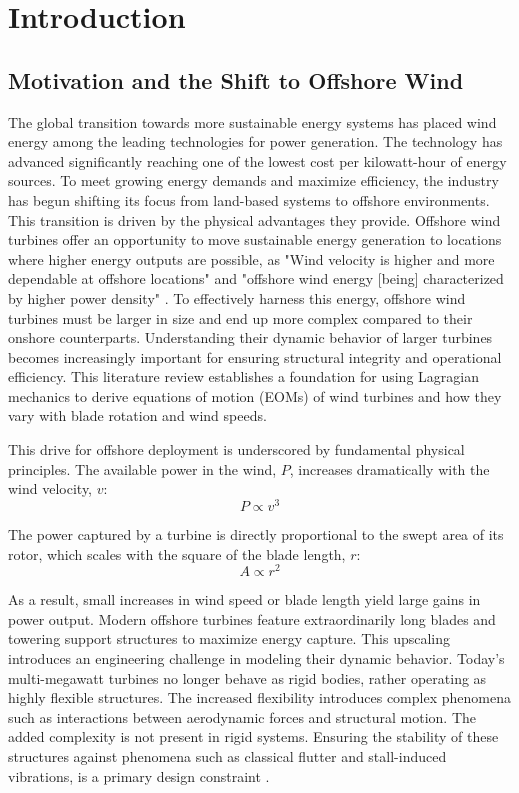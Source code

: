 \documentclass[final,onecolumn]{IEEEtran}
\begin{document}
\newpage
\tableofcontents
\newpage

\section{Introduction}

\subsection{Motivation and the Shift to Offshore Wind}
The global transition towards more sustainable energy systems has placed wind energy among the leading technologies for power generation. The technology has advanced significantly reaching one of the lowest cost per kilowatt-hour of energy sources. To meet growing energy demands and maximize efficiency, the industry has begun shifting its focus from land-based systems to offshore environments. This transition is driven by the physical advantages they provide. Offshore wind turbines offer an opportunity to move sustainable energy generation to locations where higher energy outputs are possible, as "Wind velocity is higher and more dependable at offshore locations" and "offshore wind energy [being] characterized by higher power density" \cite{Desalegn2023onshore}. To effectively harness this energy, offshore wind turbines must be larger in size and end up more complex compared to their onshore counterparts. Understanding their dynamic behavior of larger turbines becomes increasingly important for ensuring structural integrity and operational efficiency. This literature review establishes a foundation for using Lagragian mechanics to derive equations of motion (EOMs) of wind turbines and how they vary with blade rotation and wind speeds.

This drive for offshore deployment is underscored by fundamental physical principles. The available power in the wind, $P$, increases dramatically with the wind velocity, $v$:
\begin{equation}
    \label{eq:power_wind}
    P \propto v^{3}
\end{equation}

The power captured by a turbine is directly proportional to the swept area of its rotor, which scales with the square of the blade length, $r$:
\begin{equation}
    \label{eq:power_area}
    A \propto r^{2}
\end{equation}

As a result, small increases in wind speed or blade length yield large gains in power output. Modern offshore turbines feature extraordinarily long blades and towering support structures to maximize energy capture. This upscaling introduces an engineering challenge in modeling their dynamic behavior. Today's multi-megawatt turbines no longer behave as rigid bodies, rather operating as highly flexible structures. The increased flexibility introduces complex phenomena such as interactions between aerodynamic forces and structural motion. The added complexity is not present in rigid systems. Ensuring the stability of these structures against phenomena such as classical flutter and stall-induced vibrations, is a primary design constraint \cite{hansen2007aeroelastic}.
\end{document}

